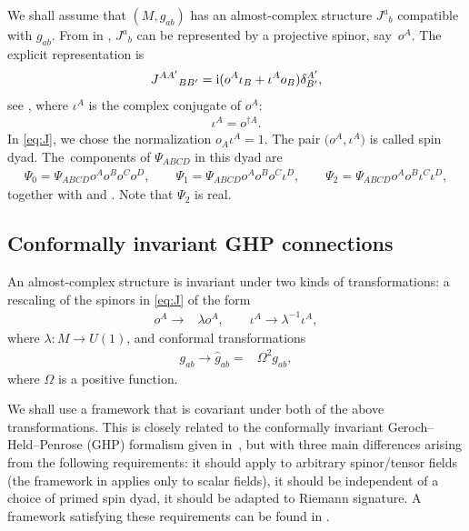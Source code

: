 \documentclass[10pt,a4paper]{amsart}
\numberwithin{equation}{section}
\begin{document}
We shall assume that $(M,g_{ab})$ has an almost-complex structure $J^{a}{}_{b}$ compatible with $g_{ab}$. From in \cite[Chapter~IV, Proposition~9.8]{lawson:michelsohn},
$J^{a}{}_{b}$ can be represented by a projective spinor, say~$o^{A}$. The explicit representation is
\begin{align}\label{eq:J}
 J^{AA'}{}_{BB'} = {\rm i} (o^{A}\iota_{B}+\iota^{A}o_{B})\delta^{A'}_{B'},
\end{align}
see \cite[equation~(4.7)]{Woodhouse_1985}, where $\iota^{A}$ is the complex conjugate of $o^{A}$:
\begin{align}\label{iota}
 \iota^A = o^{\dagger A}.
\end{align}
In \eqref{eq:J}, we chose the normalization $o_{A}\iota^{A}=1$. The pair $\bigl(o^A,\iota^A\bigr)$ is called spin dyad. The~components of $\Psi_{ABCD}$ in this dyad are
\begin{align}\label{weylspinorcomp}
\Psi_0 = \Psi_{ABCD} o^A o^B o^C o^D, \qquad \Psi_1 = \Psi_{ABCD} o^A o^B o^C \iota^D, \qquad \Psi_2 = \Psi_{ABCD} o^A o^B \iota^C \iota^D,
\end{align}
together with  and . Note that $\Psi_2$ is real.


\subsection{Conformally invariant GHP connections} \label{sec:CGHP}

An almost-complex structure is invariant under two kinds of transformations: a rescaling of the spinors in \eqref{eq:J} of the form
\begin{align}\label{GHPscaling}
o^A \to{}& \lambda o^A, \qquad \iota^A \to \lambda^{-1} \iota^A,
\end{align}
where $\lambda\colon M\to U(1)$, and conformal transformations
\begin{align}\label{conformaltmetric}
g_{ab} \to \hat g_{ab} ={}& \Omega^2 g_{ab},
\end{align}
where $\Omega$ is a positive function.

We shall use a framework that is covariant under both of the above transformations. This is closely related to the conformally invariant Geroch--Held--Penrose (GHP) formalism given in~\mbox{\cite[Section 5.6]{PR:I}}, but with three main differences arising from the following requirements: it should apply to arbitrary spinor/tensor fields (the framework in \cite[Section 5.6]{PR:I} applies only to scalar fields), it should be independent of a choice of primed spin dyad, it should be adapted to Riemann signature. A framework satisfying these requirements can be found in \cite{araneda2021conformal}.
\end{document}
